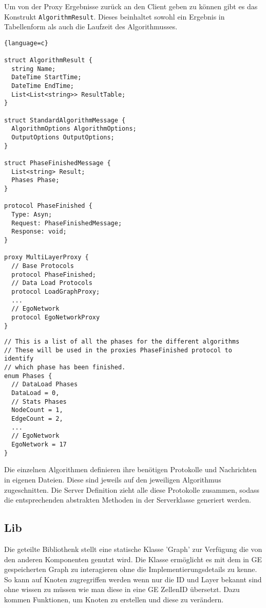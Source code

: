 Um von der Proxy Ergebnisse zurück an den Client geben zu können gibt es das Konstrukt \verb|AlgorithmResult|. Dieses beinhaltet sowohl ein Ergebnis in Tabellenform als auch die Laufzeit des Algorithmusses.


\begin{lstlisting}{language=c}

struct AlgorithmResult {
  string Name;
  DateTime StartTime;
  DateTime EndTime;
  List<List<string>> ResultTable;
}

struct StandardAlgorithmMessage {
  AlgorithmOptions AlgorithmOptions;
  OutputOptions OutputOptions;
}

struct PhaseFinishedMessage {
  List<string> Result;
  Phases Phase;
}

protocol PhaseFinished {
  Type: Asyn;
  Request: PhaseFinishedMessage;
  Response: void;
}

proxy MultiLayerProxy {
  // Base Protocols
  protocol PhaseFinished;
  // Data Load Protocols
  protocol LoadGraphProxy;
  ...
  // EgoNetwork
  protocol EgoNetworkProxy
}
\end{lstlisting}


\begin{lstlisting}
// This is a list of all the phases for the different algorithms
// These will be used in the proxies PhaseFinished protocol to identify
// which phase has been finished.
enum Phases {
  // DataLoad Phases
  DataLoad = 0,
  // Stats Phases
  NodeCount = 1,
  EdgeCount = 2,
  ...
  // EgoNetwork
  EgoNetwork = 17
}
\end{lstlisting}


Die einzelnen Algorithmen definieren ihre benötigen Protokolle und Nachrichten in eigenen Dateien. Diese sind jeweils auf den jeweiligen Algorithmus zugeschnitten.
Die Server Definition zieht alle diese Protokolle zusammen, sodass die entsprechenden abstrakten Methoden in der Serverklasse generiert werden.

\subsection{Lib}


Die geteilte Bibliothenk stellt eine statische Klasse 'Graph' zur Verfügung die von den anderen Komponenten genutzt wird. Die Klasse ermöglicht es mit dem in GE gespeicherten Graph zu interagieren ohne die Implementierungsdetails zu kenne. So kann auf Knoten zugregriffen werden wenn nur die ID und Layer bekannt sind ohne wissen zu müssen wie man diese in eine GE ZellenID übersetzt.
Dazu kommen Funktionen, um Knoten zu erstellen und diese zu verändern.



